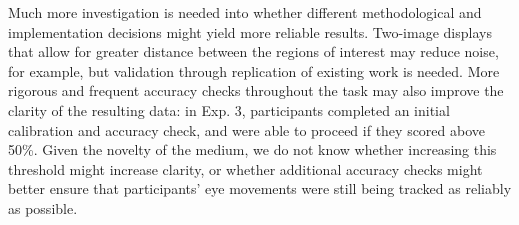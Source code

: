 \documentclass[10pt,letterpaper]{article}
\begin{document}
Much more investigation is needed into whether different methodological and implementation decisions might yield more reliable results. Two-image displays that allow for greater distance between the regions of interest may reduce noise, for example, but validation through replication of existing work is needed. More rigorous and frequent accuracy checks throughout the task may also improve the clarity of the resulting data: in Exp. 3, participants completed an initial calibration and accuracy check, and were able to proceed if they scored above 50\%. Given the novelty of the medium, we do not know whether increasing this threshold might increase clarity, or whether additional accuracy checks might better ensure that participants' eye movements were still being tracked as reliably as possible. 


%
%
%
%
\end{document}
